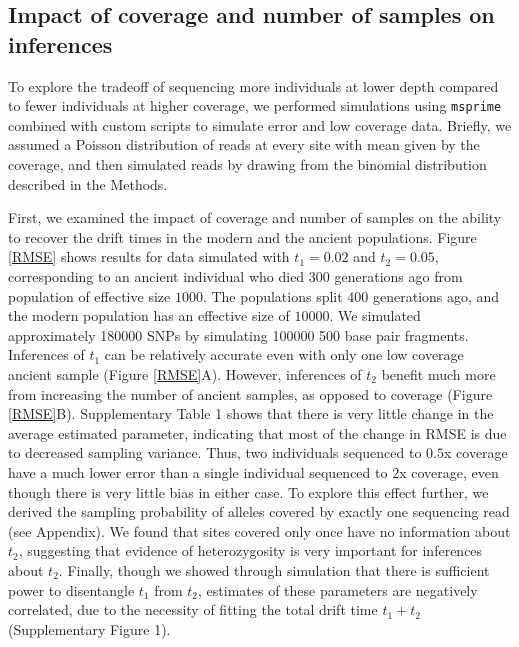 \documentclass[11pt, oneside]{article}   	%
\begin{document}
\subsection{Impact of coverage and number of samples on inferences}

To explore the tradeoff of sequencing more individuals at lower depth compared to fewer individuals at higher coverage, we performed simulations using \texttt{msprime} \citep{kelleher2016efficient} combined with custom scripts to simulate error and low coverage data. Briefly, we assumed a Poisson distribution of reads at every site with mean given by the coverage, and then simulated reads by drawing from the binomial distribution described in the Methods.

 First, we examined the impact of coverage and number of samples on the ability to recover the drift times in the modern and the ancient populations. Figure \ref{RMSE} shows results for data simulated with $t_1 = 0.02$ and $t_2 = 0.05$, corresponding to an ancient individual who died $300$ generations ago from population of effective size $1000$. The populations split $400$ generations ago, and the modern population has an effective size of $10000$. We simulated approximately 180000 SNPs by simulating 100000 500 base pair fragments. Inferences of $t_1$ can be relatively accurate even with only one low coverage ancient sample (Figure \ref{RMSE}A). However, inferences of $t_2$ benefit much more from increasing the number of ancient samples, as opposed to coverage (Figure \ref{RMSE}B). Supplementary Table 1 shows that there is very little change in the average estimated parameter, indicating that most of the change in RMSE is due to decreased sampling variance. Thus, two individuals sequenced to $0.5$x coverage have a much lower error than a single individual sequenced to $2$x coverage, even though there is very little bias in either case. To explore this effect further, we derived the sampling probability of alleles covered by exactly one sequencing read (see Appendix). We found that sites covered only once have no information about $t_2$, suggesting that evidence of  heterozygosity is very important for inferences about $t_2$. Finally, though we showed through simulation that there is sufficient power to disentangle $t_1$ from $t_2$, estimates of these parameters are negatively correlated, due to the necessity of fitting the total drift time $t_1 + t_2$ (Supplementary Figure 1).
\end{document}

